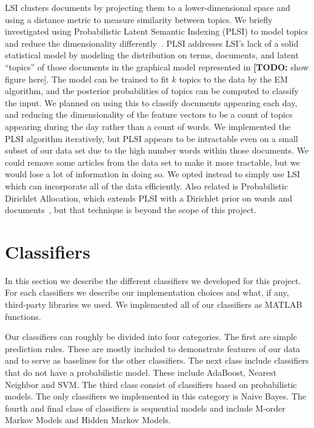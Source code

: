 \documentclass[10pt, twocolumn]{article}
\def\TODO#1{\noindent\textbf{[TODO:} #1]}
\begin{document}
LSI clusters documents by projecting them to a lower-dimensional space and using a distance metric to measure similarity between topics. We briefly investigated using Probabilistic Latent Semantic Indexing (PLSI) to model topics and reduce the dimensionality differently~\cite{plsi}. PLSI addresses LSI's lack of a solid statistical model by modeling the distribution on terms, documents, and latent ``topics'' of those documents in the graphical model represented in \TODO{show figure here}. The model can be trained to fit $k$ topics to the data by the EM algorithm, and the posterior probabilities of topics can be computed to classify the input. We planned on using this to classify documents appearing each day, and reducing the dimensionality of the feature vectors to be a count of topics appearing during the day rather than a count of words. We implemented the PLSI algorithm iteratively, but PLSI appears to be intractable even on a small subset of our data set due to the high number words within those documents. We could remove some articles from the data set to make it more tractable, but we would lose a lot of information in doing so. We opted instead to simply use LSI which can incorporate all of the data efficiently. Also related is Probabilistic Dirichlet Allocation, which extends PLSI with a Dirichlet prior on words and documents~\cite{lda}, but that technique is beyond the scope of this project.

\section{Classifiers}
\label{sec:techniques}

In this section we describe the different classifiers we developed for this project.
For each classifiers we describe our implementation choices and what, if any, third-party libraries we used.
We implemented all of our classifiers as MATLAB functions.

Our classifiers can roughly be divided into four categories. The first are simple prediction rules. These are mostly included to demonstrate features of our data and to serve as baselines for the other classifiers. The next class include classifiers that do not have a probabilistic model. These include AdaBoost, Nearest Neighbor and SVM. The third class consist of classifiers based on probabilistic models. The only classifiers we implemented in this category is Naive Bayes. The fourth and final class of classifiers is sequential models and include M-order Markov Models and Hidden Markov Models.
\end{document}

